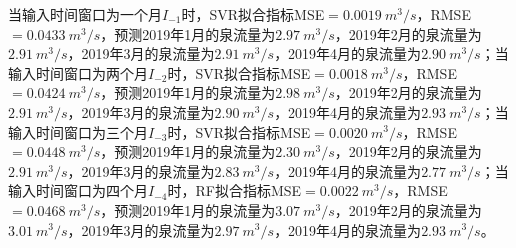当输入时间窗口为一个月$I_{-1}$时，SVR拟合指标MSE$=\SI{0.0019}{m^{3}/s}$，RMSE$=\SI{0.0433}{m^{3}/s}$，预测2019年1月的泉流量为$\SI{2.97}{m^{3}/s}$，2019年2月的泉流量为$\SI{2.91}{m^{3}/s}$，2019年3月的泉流量为$\SI{2.91}{m^{3}/s}$，2019年4月的泉流量为$\SI{2.90}{m^{3}/s}$；当输入时间窗口为两个月$I_{-2}$时，SVR拟合指标MSE$=\SI{0.0018}{m^{3}/s}$，RMSE$=\SI{0.0424}{m^{3}/s}$，预测2019年1月的泉流量为$\SI{2.98}{m^{3}/s}$，2019年2月的泉流量为$\SI{2.91}{m^{3}/s}$，2019年3月的泉流量为$\SI{2.90}{m^{3}/s}$，2019年4月的泉流量为$\SI{2.93}{m^{3}/s}$；当输入时间窗口为三个月$I_{-3}$时，SVR拟合指标MSE$=\SI{0.0020}{m^{3}/s}$，RMSE$=\SI{0.0448}{m^{3}/s}$，预测2019年1月的泉流量为$\SI{2.30}{m^{3}/s}$，2019年2月的泉流量为$\SI{2.91}{m^{3}/s}$，2019年3月的泉流量为$\SI{2.83}{m^{3}/s}$，2019年4月的泉流量为$\SI{2.77}{m^{3}/s}$；当输入时间窗口为四个月$I_{-4}$时，RF拟合指标MSE$=\SI{0.0022}{m^{3}/s}$，RMSE$=\SI{0.0468}{m^{3}/s}$，预测2019年1月的泉流量为$\SI{3.07}{m^{3}/s}$，2019年2月的泉流量为$\SI{3.01}{m^{3}/s}$，2019年3月的泉流量为$\SI{2.97}{m^{3}/s}$，2019年4月的泉流量为$\SI{2.93}{m^{3}/s}$。

